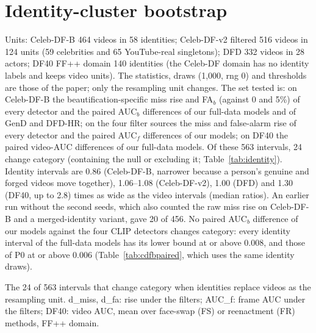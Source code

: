 \documentclass[10pt]{article}
\begin{document}
\section{Identity-cluster bootstrap}
\label{sec:identity}
Units: Celeb-DF-B 464 videos in 58 identities; Celeb-DF-v2 filtered 516 videos in 124 units (59 celebrities and 65 YouTube-real
singletons); DFD 332 videos in 28 actors; DF40 FF++ domain 140 identities (the Celeb-DF domain has no identity labels and keeps
video units). The statistics, draws (1,000, rng 0) and thresholds are those of the paper; only the resampling unit changes. The
set tested is: on Celeb-DF-B the beautification-specific miss rise and FA$_b$ (against 0 and 5\%) of every detector and the paired
AUC$_b$ differences of our full-data models and of GenD and DFD-HR; on the four filter sources the miss and false-alarm rise of every
detector and the paired AUC$_f$ differences of our models; on DF40 the paired video-AUC differences of our full-data models. Of these
563 intervals, 24 change category (containing the null or excluding it; Table~\ref{tab:identity}). Identity intervals are 0.86
(Celeb-DF-B, narrower because a person's genuine and forged videos move together), 1.06--1.08 (Celeb-DF-v2), 1.00 (DFD) and 1.30
(DF40, up to 2.8) times as wide as the video intervals (median ratios). An earlier run without the second seeds, which also counted
the raw miss rise on Celeb-DF-B and a merged-identity variant, gave 20 of 456. No paired AUC$_b$ difference of our models against
the four CLIP detectors changes category: every identity interval of the full-data models has its lower bound at or above 0.008,
and those of P0 at or above 0.006 (Table~\ref{tab:cdfbpaired}, which uses the same identity draws).
\begin{table}[H]
\centering
\caption{The 24 of 563 intervals that change category when identities replace videos as the resampling unit.
d\_miss, d\_fa: rise under the filters; AUC\_f: frame AUC under the filters; DF40: video AUC, mean over face-swap (FS) or reenactment
(FR) methods, FF++ domain.}
\label{tab:identity}
\scriptsize
\begin{adjustbox}{max width=\linewidth}\end{adjustbox}
\end{table}
\end{document}
